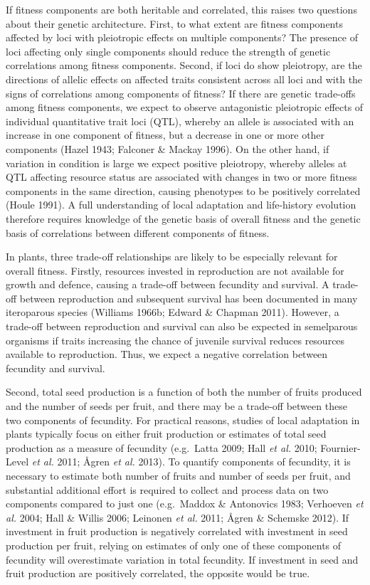 \documentclass[
]{article}
\begin{document}
If fitness components are both heritable and correlated, this raises two questions about their genetic architecture. First, to what extent are fitness components affected by loci with pleiotropic effects on multiple components? The presence of loci affecting only single components should reduce the strength of genetic correlations among fitness components. Second, if loci do show pleiotropy, are the directions of allelic effects on affected traits consistent across all loci and with the signs of correlations among components of fitness? If there are genetic trade-offs among fitness components, we expect to observe antagonistic pleiotropic effects of individual quantitative trait loci (QTL), whereby an allele is associated with an increase in one component of fitness, but a decrease in one or more other components (Hazel 1943; Falconer \& Mackay 1996). On the other hand, if variation in condition is large we expect positive pleiotropy, whereby alleles at QTL affecting resource status are associated with changes in two or more fitness components in the same direction, causing phenotypes to be positively correlated (Houle 1991). A full understanding of local adaptation and life-history evolution therefore requires knowledge of the genetic basis of overall fitness and the genetic basis of correlations between different components of fitness.

In plants, three trade-off relationships are likely to be especially relevant for overall fitness. Firstly, resources invested in reproduction are not available for growth and defence, causing a trade-off between fecundity and survival. A trade-off between reproduction and subsequent survival has been documented in many iteroparous species (Williams 1966b; Edward \& Chapman 2011). However, a trade-off between reproduction and survival can also be expected in semelparous organisms if traits increasing the chance of juvenile survival reduces resources available to reproduction. Thus, we expect a negative correlation between fecundity and survival.

Second, total seed production is a function of both the number of fruits produced and the number of seeds per fruit, and there may be a trade-off between these two components of fecundity. For practical reasons, studies of local adaptation in plants typically focus on either fruit production or estimates of total seed production as a measure of fecundity (e.g.~Latta 2009; Hall \emph{et al.} 2010; Fournier-Level \emph{et al.} 2011; Ågren \emph{et al.} 2013). To quantify components of fecundity, it is necessary to estimate both number of fruits and number of seeds per fruit, and substantial additional effort is required to collect and process data on two components compared to just one (e.g.~Maddox \& Antonovics 1983; Verhoeven \emph{et al.} 2004; Hall \& Willis 2006; Leinonen \emph{et al.} 2011; Ågren \& Schemske 2012). If investment in fruit production is negatively correlated with investment in seed production per fruit, relying on estimates of only one of these components of fecundity will overestimate variation in total fecundity. If investment in seed and fruit production are positively correlated, the opposite would be true.
\end{document}
